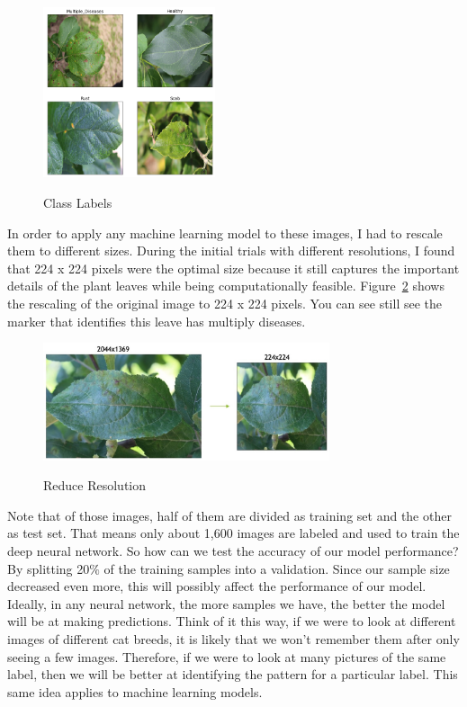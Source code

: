 \documentclass[man,floatsintext]{apa7}
\begin{document}
\begin{singlespace}
\begin{figure}
  \centering
  \caption{Class Labels}
  \includegraphics[width=0.45\textwidth]{images/image1.png}
  \label{fig:Figure1}
\end{figure}

In order to apply any machine learning model to these images, I had to rescale them to different sizes. During the initial trials with different resolutions, I found that 224 x 224 pixels were the optimal size because it still captures the important details of the plant leaves while being computationally feasible. Figure~\ref{fig:Figure2} shows the rescaling of the original image to 224 x 224 pixels. You can see still see the marker that identifies this leave has multiply diseases.

\begin{figure}
  \centering
  \caption{Reduce Resolution}
  \includegraphics[width=0.75\textwidth]{images/image2.jpg}
  \label{fig:Figure2}
\end{figure}

Note that of those images, half of them are divided as training set and the other as test
set. That means only about 1,600 images are labeled and used to train the deep neural network. So how can we test the accuracy of our model performance? By splitting 20$\%$ of the training samples into a validation. Since our sample size decreased even more, this will possibly affect the performance of our model. Ideally, in any neural network, the more samples we have, the better the model will be at making predictions. Think of it this way, if we were to look at different images of different cat breeds, it is likely that we won’t remember them after only seeing a few images. Therefore, if we were to look at many pictures of the same label, then we will be better at identifying the pattern for a particular label. This same idea applies to machine learning models.


\end{singlespace}
\end{document}
